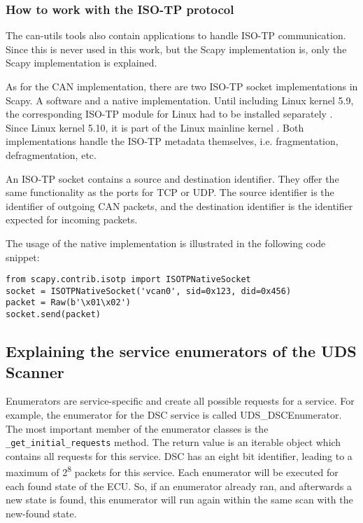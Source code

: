 \subsubsection{How to work with the ISO-TP protocol}

The can-utils tools also contain applications to handle ISO-TP communication. Since this is never used in this work, but the Scapy implementation is, only the Scapy implementation is explained.

As for the CAN implementation, there are two ISO-TP socket implementations in Scapy. A software and a native implementation. Until including Linux kernel 5.9, the corresponding ISO-TP module for Linux had to be installed separately \cite{isotp-module}. Since Linux kernel 5.10, it is part of the Linux mainline kernel \cite{isotp-commit}. Both implementations handle the ISO-TP metadata themselves, i.e.  fragmentation, defragmentation, etc.

An ISO-TP socket contains a source and destination identifier. They offer the same functionality as the ports for TCP or UDP. The source identifier is the identifier of outgoing CAN packets, and the destination identifier is the identifier expected for incoming packets.

The usage of the native implementation is illustrated in the following code snippet:

\begin{samepage}
\begin{verbatim}
from scapy.contrib.isotp import ISOTPNativeSocket
socket = ISOTPNativeSocket('vcan0', sid=0x123, did=0x456)
packet = Raw(b'\x01\x02')
socket.send(packet)
\end{verbatim}
\end{samepage}

\subsection{Explaining the service enumerators of the UDS Scanner}


Enumerators are service-specific and create all possible requests for a service.
For example, the enumerator for the DSC service is called UDS\_DSCEnumerator. The most important member of the enumerator classes is the \texttt{_get_initial_requests} method. The return value is an iterable object which contains all requests for this service. DSC has an eight bit identifier, leading to a maximum of 2\textsuperscript{8} packets for this service. Each enumerator will be executed for each found state of the ECU. So, if an enumerator already ran, and afterwards a new state is found, this enumerator will run again within the same scan with the new-found state.

